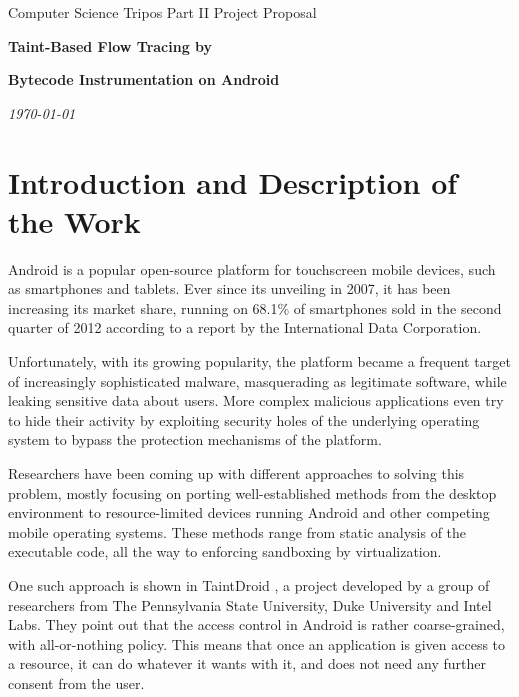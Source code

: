 \documentclass[12pt]{article}
\begin{document}
\thispagestyle{empty}

\medskip
{}
\medskip
{}

\vspace{0.3in}
\centerline{\large Computer Science Tripos Part II Project Proposal}
\vspace{0.4in}
\centerline{\Large\bf Taint-Based Flow Tracing by}
\vspace{0.1in}
\centerline{\Large\bf Bytecode Instrumentation on Android}
\vspace{0.3in}
\cleanlookdateon
\centerline{\large \emph \today}
\vspace{0.5in}

\section*{Introduction and Description of the Work}

Android is a popular open-source platform for touchscreen
mobile devices, such as smartphones and tablets. Ever since its unveiling 
in 2007, it has been increasing its market share, running on 68.1\% of 
smartphones sold in the second quarter of 2012 according to a report by 
the International Data Corporation. 
\cite{www.idc.com/getdoc.jsp?containerId=prUS23638712}

Unfortunately, with its growing popularity, the platform became a frequent
target of increasingly sophisticated malware, masquerading as legitimate
software, while leaking sensitive data about users. More complex
malicious applications even try to hide their activity by exploiting 
security holes of the underlying operating system to bypass the 
protection mechanisms of the platform.

Researchers have been coming up with different approaches to solving
this problem, mostly focusing on porting well-established methods from
the desktop environment to resource-limited devices running Android and
other competing mobile operating systems. These methods range from 
static analysis of the executable code, all the way to enforcing sandboxing 
by virtualization. 

One such approach is shown in TaintDroid \cite{www.appanalysis.org}, 
a project developed by a group of researchers from The Pennsylvania State
University, Duke University and Intel Labs. They point out that the
access control in Android is rather coarse-grained, with all-or-nothing
policy. This means that once an application is given access to a resource,
it can do whatever it wants with it, and does not need any further consent 
from the user.
\end{document}
